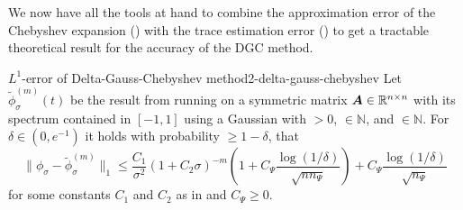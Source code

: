 We now have all the tools at hand to combine the approximation error of the
Chebyshev expansion () with the trace estimation
error () to get a tractable theoretical
result for the accuracy of the \gls{DGC} method.

\begin{theorem}{$L^1$-error of Delta-Gauss-Chebyshev method}{2-delta-gauss-chebyshev}
    Let $\widetilde{\phi}_{\sigma}^{(m)}(t)$ be the result from running 
    on a symmetric matrix $\boldsymbol{A} \in \mathbb{R}^{n \times n}$ with its spectrum contained in $[-1, 1]$ using
    a Gaussian  with
     $>0$,  $\in \mathbb{N}$, and
     $\in \mathbb{N}$. For $\delta \in (0, e^{-1})$ it holds with
    probability $\geq 1-\delta$, that
    \begin{equation}
        \lVert \phi_{\sigma} - \widetilde{\phi}_{\sigma}^{(m)}\rVert _1
        \leq \frac{C_1}{\sigma^2} (1 + C_2 \sigma)^{-m} \left( 1 + C_{\Psi} \frac{\log(1/\delta)}{\sqrt{n n_{\Psi}}} \right) + C_{\Psi} \frac{\log(1/\delta)}{\sqrt{n_{\Psi}}}
    \end{equation}
    for some constants $C_1$ and $C_2$ as in  and $C_{\Psi} \geq 0$.
\end{theorem}

